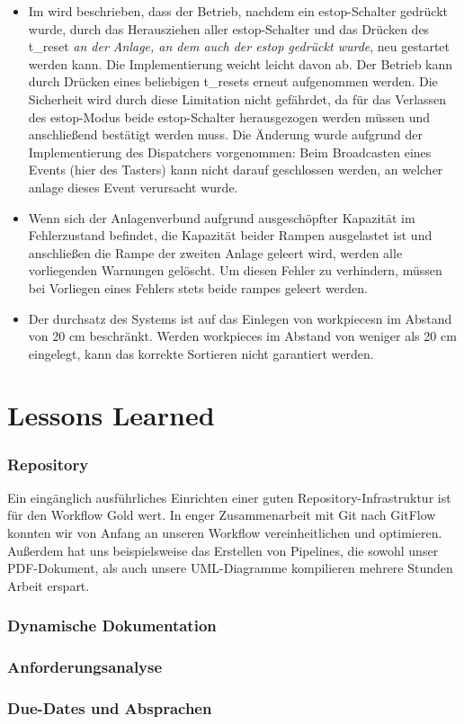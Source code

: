 \begin{itemize}
    \item Im  wird beschrieben, dass der Betrieb, nachdem ein \gls{estop}-Schalter gedrückt wurde,
    durch das Herausziehen aller \gls{estop}-Schalter und das Drücken des \gls{t_reset}
    \textit{an der Anlage, an dem auch der \gls{estop} gedrückt wurde}, neu gestartet werden kann.
    Die Implementierung weicht leicht davon ab.
    Der Betrieb kann durch Drücken eines beliebigen \glspl{t_reset} erneut aufgenommen werden.
    Die Sicherheit wird durch diese Limitation nicht gefährdet, da für das Verlassen des
    \gls{estop}-Modus beide \gls{estop}-Schalter herausgezogen werden müssen und anschließend
    bestätigt werden muss.
    Die Änderung wurde aufgrund der Implementierung des Dispatchers vorgenommen:
    Beim Broadcasten eines Events (hier des Tasters) kann nicht darauf geschlossen werden, an
    welcher \gls{anlage} dieses Event verursacht wurde.
    \item Wenn sich der Anlagenverbund aufgrund ausgeschöpfter Kapazität im Fehlerzustand befindet,
    die Kapazität beider Rampen ausgelastet ist und anschließen die Rampe der zweiten Anlage
    geleert wird, werden alle vorliegenden Warnungen gelöscht.
    Um diesen Fehler zu verhindern, müssen bei Vorliegen eines Fehlers stets beide \glspl{rampe}
    geleert werden.
    \item Der \gls{durchsatz} des Systems ist auf das Einlegen von \glspl{workpiece}n im
    Abstand von 20 cm beschränkt.
    Werden \glspl{workpiece} im Abstand von weniger als 20 cm eingelegt, kann das korrekte Sortieren
    nicht garantiert werden.
\end{itemize}


\section{Lessons Learned}\label{sec:lessons-learned}

\subsubsection{Repository}
Ein eingänglich ausführliches Einrichten einer guten Repository-Infrastruktur ist für den Workflow
Gold wert.
In enger Zusammenarbeit mit Git nach GitFlow konnten wir von Anfang an unseren Workflow vereinheitlichen
und optimieren.
Außerdem hat uns beispielsweise das Erstellen von Pipelines, die sowohl unser PDF-Dokument, als auch unsere
UML-Diagramme kompilieren mehrere Stunden Arbeit erspart.


\subsubsection{Dynamische Dokumentation}

\subsubsection{Anforderungsanalyse}

\subsubsection{Due-Dates und Absprachen}

\subsubsection{}